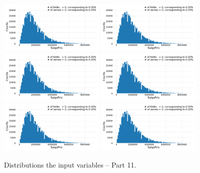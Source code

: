 \begin{figure}
  \subfloat{\qquad}
  \includegraphics[draft=false, width=0.45\textwidth, page=127, trim=15 0 15 0, clip]{figures/housing/overview_fig.pdf}\hfil
  \subfloat{\qquad}
  \includegraphics[draft=false, width=0.45\textwidth, page=128, trim=15 0 15 0, clip]{figures/housing/overview_fig.pdf}
  \subfloat{\qquad}
  \includegraphics[draft=false, width=0.45\textwidth, page=129, trim=15 0 15 0, clip]{figures/housing/overview_fig.pdf}\hfil
  \subfloat{\qquad}
  \includegraphics[draft=false, width=0.45\textwidth, page=130, trim=15 0 15 0, clip]{figures/housing/overview_fig.pdf}
  \subfloat{\qquad}
  \includegraphics[draft=false, width=0.45\textwidth, page=131, trim=15 0 15 0, clip]{figures/housing/overview_fig.pdf}\hfil
  \subfloat{\qquad}
  \includegraphics[draft=false, width=0.45\textwidth, page=132, trim=15 0 15 0, clip]{figures/housing/overview_fig.pdf}
  \caption[Distributions of the Input Variables -- Part 11]{Distributions the input variables -- Part 11.}
  \label{fig:h:variable_overview_all_11}
  \vspace{\abovecaptionskip}
\end{figure}

